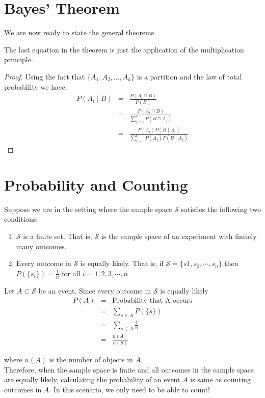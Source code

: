 \section{Bayes' Theorem}
We are now ready to state the general theorems  

The last equation in the theorem is just the application of the multiplication principle. 



\begin{proof}
Using the fact that $\{A_1, A_2, \dots, A_k\}$ is a partition and the law of total probability we have:
    \begin{eqnarray*}
    P(A_i \mid B) &=& \frac{P(A_i \cap B)}{P(B)}\\
    &=& \frac{P(A_i \cap B) }{\sum_{j=1}^k P(B\cap A_j)}\\
    &=&\frac{P(A_i)P(B\mid A_i)}{\sum_{j=1}^k P(A_j) P(B \mid A_j)}
\end{eqnarray*}
\end{proof}












\section[Probability and Counting]{Probability and Counting}
Suppose we are in the setting where the sample space $\mathcal{S}$ satisfies the following two conditions:
\begin{enumerate}
\item $\mathcal{S}$ is a finite set. That is, $\mathcal{S}$ is the sample space of an experiment with finitely many outcomes.
\item Every outcome in $\mathcal{S}$ is equally likely. That is, if $\mathcal{S}=\{s1,s_2,\cdots,s_n\}$ then $P(\{s_i\})=\frac{1}{n}$ for all $i=1,2,3,\cdots,n$
\end{enumerate}
Let $A\subset \mathcal{S}$ be an event. Since every outcome in $\mathcal{S}$ is equally likely 
\begin{eqnarray*}
P(A)&=&\text{Probability that A occurs}\\
&=& \sum_{s\in A} P(\{s\})\\
&=& \sum_{s\in A} \frac{1}{n}\\
&=& \frac{n(A)}{n(S)}
\end{eqnarray*}

where $n(A)$ is the number of objects in $A$. 
\\
Therefore, when the sample space is finite and all outcomes in the sample space are equally likely, calculating the probability of an event $A$ is same as counting outcomes in $A$. In this scenario, we only need to be able to count! 
\\

